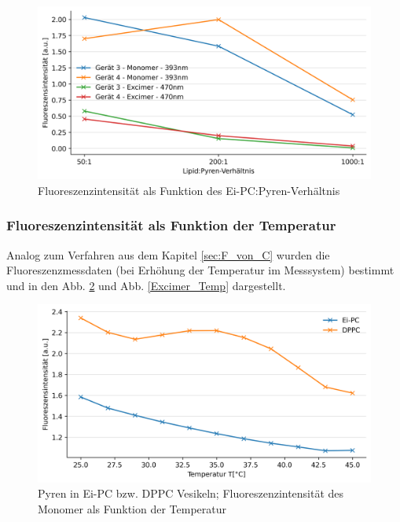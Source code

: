 \begin{figure}[h!]
	\begin{center}
		\begin{minipage}{0,8\textwidth}
			
			\includegraphics[width=\textwidth]{analysis/reports/Konz_Verh.png}
			\caption{Fluoreszenzintensität als Funktion des Ei-PC:Pyren-Verhältnis} 
			\label{Konz_Verh} 
		\end{minipage}
	\end{center}
\end{figure}
\vspace*{3.4cm}


\subsubsection{Fluoreszenzintensität als Funktion der Temperatur} \label{sec:FvonT}

Analog zum Verfahren aus dem Kapitel \ref{sec:F_von_C} wurden die Fluoreszenzmessdaten (bei Erhöhung der Temperatur im Messsystem) bestimmt und in den Abb. \ref{Monomer_Temp} und Abb. \ref{Excimer_Temp} dargestellt.

\begin{figure}[h!]
	\begin{center}
		\begin{minipage}{0,8\textwidth}
			
			\includegraphics[width=\textwidth]{analysis/reports/Monomer_Temp.png}
			\caption{Pyren in Ei-PC bzw. DPPC Vesikeln; Fluoreszenzintensität des Monomer als Funktion der Temperatur} 
			\label{Monomer_Temp} 
		\end{minipage}
	\end{center}
\end{figure}


